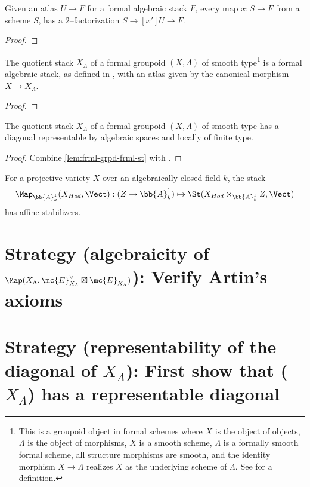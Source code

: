 \begin{lem}\label{lem:lift-point-atlas}
Given an atlas $U \to F$ for a formal algebraic stack $F$, every map
$x : S \to F$ from a scheme $S$, has a $2$--factorization
$S \to[x'] U \to F$.
\end{lem}
\begin{proof}
\end{proof}

\begin{lem}\label{lem:frml-grpd-frml-st}
The quotient stack $X_\Lambda$ of a formal groupoid $(X, \Lambda)$ of smooth
type\footnote{This is a groupoid object in formal schemes where
$X$ is the object of objects,
$\Lambda$ is the object of morphisms,
$X$ is a smooth scheme,
$\Lambda$ is a formally smooth formal scheme,
all structure morphisms are smooth,
and the identity morphism $X \to \Lambda$ realizes $X$ as the underlying scheme
of $\Lambda$. See \cite[29]{NonAbHodgeFilt} for a definition.}
is a formal algebraic stack, as defined in \cite[Definition 5.3]{FormalAlgSt},
with an atlas given by the canonical morphism $X \to X_\Lambda$.
\end{lem}
\begin{proof}
\end{proof}

\begin{cor}
The quotient stack $X_\Lambda$ of a formal groupoid $(X, \Lambda)$ of smooth
type has a diagonal representable by algebraic spaces and locally of finite
type.
\end{cor}
\begin{proof}
Combine \cref{lem:frml-grpd-frml-st} with \cite[5.12]{FormalAlgSt}.
\end{proof}

\begin{thm}
For a projective variety $X$ over an algebraically closed field $k$,
the stack
\[
\Map_{\bb{A}^1_k}(X_{Hod}, \Vect) : (Z \to \bb{A}^1_k)
\mapsto \St(X_{Hod} \times_{\bb{A}^1_k} Z, \Vect)
\]
has affine stabilizers.
\end{thm}

\section{Strategy (algebraicity of
{$\Map(X_\Lambda, \mc{E}_{X_\Lambda}^\vee \boxtimes \mc{E}_{X_\Lambda})$)}:
Verify Artin's axioms}

\section{Strategy (representability of the diagonal of {$X_\Lambda$}):
First show that ($X_\Lambda$) has a representable diagonal}

